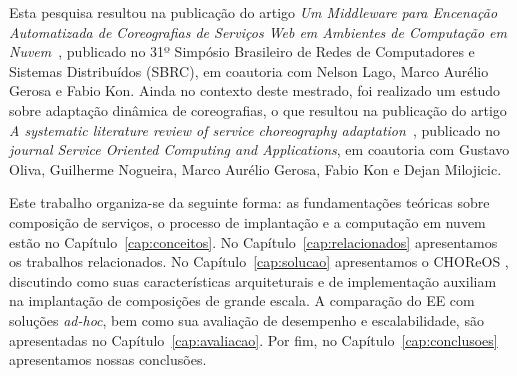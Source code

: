 Esta pesquisa resultou na publicação do artigo \emph{Um Middleware para Encenação Automatizada de Coreografias de Serviços Web em Ambientes de Computação em Nuvem}~\cite{Leite2013EE}, publicado no 31º Simpósio Brasileiro de Redes de Computadores e Sistemas Distribuídos (SBRC), em coautoria com Nelson Lago, Marco Aurélio Gerosa e Fabio Kon. Ainda no contexto deste mestrado, foi realizado um estudo sobre adaptação dinâmica de coreografias, o que resultou na publicação do artigo \emph{A systematic literature review of service choreography adaptation}~\cite{Leite2013SystematicReview}, publicado no \emph{journal Service Oriented Computing and Applications}, em coautoria com Gustavo Oliva, Guilherme Nogueira, Marco Aurélio Gerosa, Fabio Kon e Dejan Milojicic. 

Este trabalho organiza-se da seguinte forma: as fundamentações teóricas sobre composição de serviços, o processo de implantação e a computação em nuvem estão no Capítulo~\ref{cap:conceitos}. No Capítulo~\ref{cap:relacionados} apresentamos os trabalhos relacionados. No Capítulo~\ref{cap:solucao} apresentamos o CHOReOS \ee, discutindo como suas características arquiteturais e de implementação auxiliam na implantação de composições de grande escala. A comparação do EE com soluções \emph{ad-hoc}, bem como sua avaliação de desempenho e escalabilidade, são apresentadas no Capítulo~\ref{cap:avaliacao}. Por fim, no Capítulo~\ref{cap:conclusoes} apresentamos nossas conclusões.




